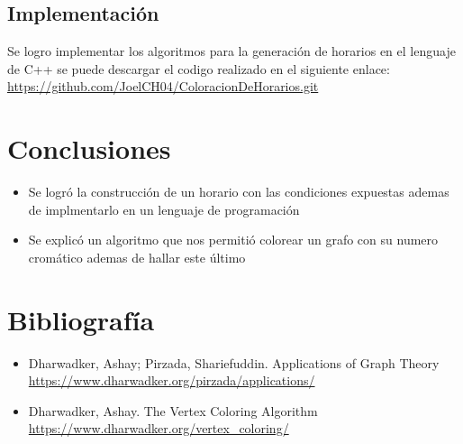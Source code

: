 \documentclass[letterpaper,12pt]{article}
\begin{document}
    \subsection{Implementación}
    Se logro implementar los algoritmos para la generación de horarios en el lenguaje de C++ se puede descargar el codigo realizado en el siguiente enlace: \url{https://github.com/JoelCH04/ColoracionDeHorarios.git}
    \section{Conclusiones}
    \begin{itemize}
    \item Se logró la construcción de un horario con las condiciones expuestas ademas de implmentarlo en un lenguaje de programación
    \item Se explicó un algoritmo que nos permitió colorear un grafo con su numero cromático ademas de hallar este último
    \end{itemize}
    
    \section{Bibliografía}
    \begin{itemize}
        \item Dharwadker, Ashay; Pirzada, Shariefuddin. Applications of Graph Theory \url{https://www.dharwadker.org/pirzada/applications/}
        \item Dharwadker, Ashay. The Vertex Coloring Algorithm \url{https://www.dharwadker.org/vertex_coloring/}
    \end{itemize}
\end{document}
